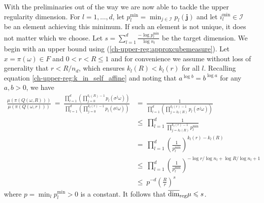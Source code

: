 With the preliminaries out of the way we are now able to tackle the upper regularity dimension. For $l=1,\ldots, d$, let $p_l^{\text{min}}=\min_{j\in \mathcal{I}} p_l(\mathbf{j})$  and let  $i_l^{\min} \in \mathcal{I}$ be an element achieving this minimum.  If such an element is not unique, it does not matter which we choose. Let $s=\sum_{l=1}^d\frac{-\log p_l^{\text{min}}}{\log n_l}$ be the target dimension. We begin with an upper bound using (\ref{ch-upper-reg:approxcubemeasure}). Let $x = \pi(\omega ) \in F$ and $0< r < R\le 1$ and for convenience we assume without loss of generality that $r < R/ n_d$, which ensures $k_l(R) < k_l(r)$ for all $l$. Recalling equation \eqref{ch-upper-reg:k_in_self_affine} and noting that $a^{\log b} = b^{\log a}$ for any $a,b > 0$, we have
\begin{align*}
\frac{\mu(\pi(Q(\omega,R)))}{\mu(\pi(Q(\omega,r)))} \ = \ \frac{\prod_{l=1}^d\left(\prod_{j=0}^{k_l(R)-1}p_l(\sigma^j \omega) \right)}{\prod_{l=1}^d\left(\prod_{j=0}^{k_l(r)-1}p_l(\sigma^j \omega) \right)}  & = \ \frac{1}{\prod_{l=1}^d\left(\prod_{j=k_l(R)}^{k_l(r)-1}p_l(\sigma^j \omega) \right)} \\
& \le\  \prod_{l=1}^d \frac{1}{\prod_{j=k_l(R)}^{k_l(r)-1}p_l^{\text{min}}} \\
& =\  \prod_{l=1}^d\left( \frac{1}{p_l^{\text{min}}}\right)^{k_l(r)-k_l(R)} \\
& \le\  \prod_{l=1}^d \left( \frac{1}{p_l^{\text{min}}}\right)^{-\log r/\log n_l + \log R/\log n_l + 1}  \\
& \le \ p^{-d} \left( \frac{R}{r} \right)^{s}
\end{align*}
where $p = \min_l p_l^{\text{min}}>0$ is a constant. It follows that $\overline{\dim}_{\textup{reg}} \mu \leqslant s$.

